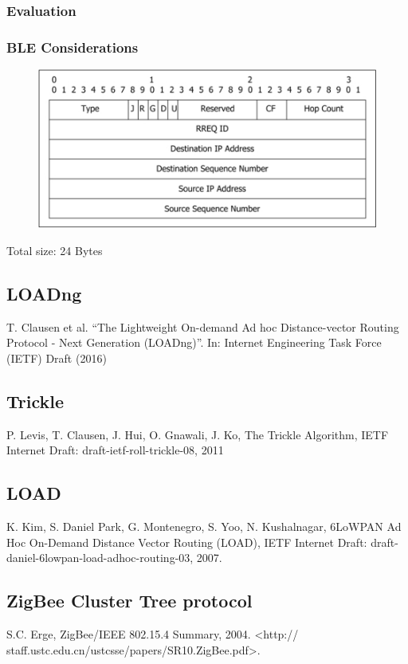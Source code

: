       \subsubsection{Evaluation}

      \subsubsection{BLE Considerations}
      \FloatBarrier
      \begin{figure}[h]
        \includegraphics[width=\textwidth]{Images/rreq_packet_format.png}
      \end{figure}
      \FloatBarrier
      Total size: 24 Bytes

      \subsection{LOADng}
      T. Clausen et al. “The Lightweight On-demand Ad hoc Distance-vector Routing Protocol
- Next Generation (LOADng)”. In: Internet Engineering Task Force (IETF) Draft
(2016)

      \subsection{Trickle}
      P. Levis, T. Clausen, J. Hui, O. Gnawali, J. Ko, The Trickle Algorithm, IETF
      Internet Draft: draft-ietf-roll-trickle-08, 2011

      \subsection{LOAD}
      K. Kim, S. Daniel Park, G. Montenegro, S. Yoo, N. Kushalnagar,
6LoWPAN Ad Hoc On-Demand Distance Vector Routing (LOAD), IETF
Internet Draft: draft-daniel-6lowpan-load-adhoc-routing-03, 2007.

      \subsection{ZigBee Cluster Tree protocol}
      S.C. Erge, ZigBee/IEEE 802.15.4 Summary, 2004. <http://
staff.ustc.edu.cn/ustcsse/papers/SR10.ZigBee.pdf>.

